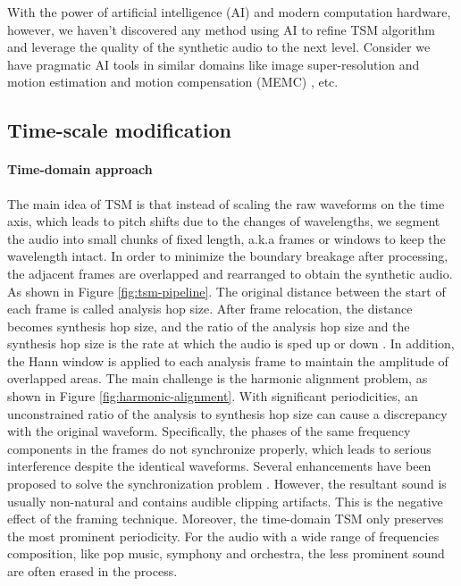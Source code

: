 \documentclass[12pt]{article}
\begin{document}
With the power of artificial intelligence (AI) and modern computation hardware, however, we haven't discovered any method using AI to refine TSM algorithm and leverage the quality of the synthetic audio to the next level. Consider we have pragmatic AI tools in similar domains like image super-resolution \cite{led17} and motion estimation and motion compensation (MEMC) \cite{bao21}, etc.

\subsection{Time-scale modification}
\paragraph{Time-domain approach}
The main idea of TSM is that instead of scaling the raw waveforms on the time axis, which leads to pitch shifts due to the changes of wavelengths, we segment the audio into small chunks of fixed length, a.k.a frames or windows to keep the wavelength intact. In order to minimize the boundary breakage after processing, the adjacent frames are overlapped and rearranged to obtain the synthetic audio. As shown in Figure \ref{fig:tsm-pipeline}. The original distance between the start of each frame is called analysis hop size. After frame relocation, the distance becomes synthesis hop size, and the ratio of the analysis hop size and the synthesis hop size is the rate at which the audio is sped up or down \cite{dri16}. In addition, the Hann window \cite{ess86} is applied to each analysis frame to maintain the amplitude of overlapped areas. The main challenge is the harmonic alignment problem, as shown in Figure \ref{fig:harmonic-alignment}. With significant periodicities, an unconstrained ratio of the analysis to synthesis hop size can cause a discrepancy with the original waveform. Specifically, the phases of the same frequency components in the frames do not synchronize properly, which leads to serious interference despite the identical waveforms. Several enhancements have been proposed to solve the synchronization problem \cite{hej91}\cite{eri90}\cite{ver93}. However, the resultant sound is usually non-natural and contains audible clipping artifacts. This is the negative effect of the framing technique. Moreover, the time-domain TSM only preserves the most prominent periodicity. For the audio with a wide range of frequencies composition, like pop music, symphony and orchestra, the less prominent sound are often erased in the process.
\end{document}
